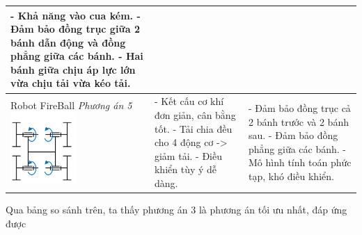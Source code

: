 \begin{longtable}{|p{4cm}|p{5cm}|p{5cm}|}
                - Khả năng vào cua kém. \newline
                - Đảm bảo đồng trục giữa 2 bánh dẫn động và đồng phẳng giữa các bánh. \newline
                - Hai bánh giữa chịu áp lực lớn vừa chịu tải vừa kéo tải. \\
                \hline
                Robot FireBall \newline
                \textit{Phương án 5} \newline
                \includegraphics[width=2.5cm]{pictures/robot_fireball.png} &
                - Kết cấu cơ khí đơn giản, cân bằng tốt. \newline
                - Tải chia đều cho 4 động cơ -> giảm tải. \newline
                - Điều khiển tùy ý dễ dàng. &
                - Đảm bảo đồng trục cả 2 bánh trước và 2 bánh sau. \newline
                - Đảm bảo đồng phẳng giữa các bánh. \newline
                - Mô hình tính toán phức tạp, khó điều khiển. \\ 
            \end{longtable}
            \hspace*{0.6cm}Qua bảng so sánh trên, ta thấy phương án 3 là phương án tối ưu nhất, đáp ứng được